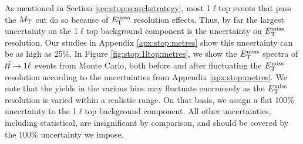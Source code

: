 As mentioned in Section \ref{sec:stop:searchstrategy}, most 1$\ell$top
events that pass the $M_\text{T}$ cut do so because of $E_\text{T}^\text{miss}$ resolution
effects. Thus, by far the largest uncertainty on the 1$\ell$top
background component is the uncertainty on $E_\text{T}^\text{miss}$ resolution. Our
studies in Appendix \ref{apx:stop:metres} show this uncertainty can be as high as 25\%. In
Figure \ref{fig:stop:1ltop:metres}, we show the $E_\text{T}^\text{miss}$ spectra of
$t\bar{t} \rightarrow 1\ell$ events from Monte Carlo, both before and after fluctuating
the $E_\text{T}^\text{miss}$ resolution according to the uncertainties from
Appendix \ref{apx:stop:metres}. We note that the yields in the various bins may fluctuate
enormously as the $E_\text{T}^\text{miss}$ resolution is varied within a realistic range. On that
basis, we assign a flat 100\% uncertainty to the 1$\ell$top background
component. All other uncertainties, including statistical, are
insignificant by comparison, and should be covered by the 100\%
uncertainty we impose.

